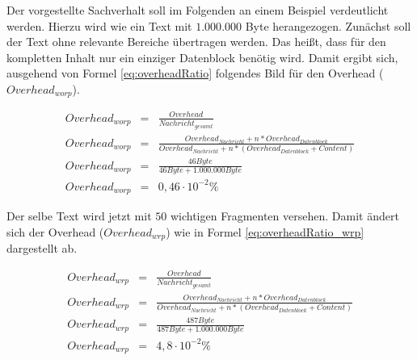 Der vorgestellte Sachverhalt soll im Folgenden an einem Beispiel
verdeutlicht werden. Hierzu wird wie ein Text mit $1.000.000$ Byte herangezogen.
Zunächst soll der Text ohne relevante Bereiche übertragen werden. Das heißt,
dass für den kompletten Inhalt nur ein einziger Datenblock benötig wird. Damit
ergibt sich, ausgehend von Formel \ref{eq:overheadRatio} folgendes Bild für den
Overhead ($Overhead_{worp}$).


\begin{eqnarray} 
	Overhead_{worp} & = & \frac{Overhead}{Nachricht_{gesamt}}\\
	Overhead_{worp} & = & \frac{Overhead_{Nachricht} + n * Overhead_{Datenblock}}{Overhead_{Nachricht} + n * (Overhead_{Datenblock} + Content)}\\
	Overhead_{worp} & = & \frac{46 Byte}{46 Byte + 1.000.000 Byte} \\
	Overhead_{worp} & = & 0,46 \cdot 10^{-2} \%
	\label{eq:overheadRatio_worp}
\end{eqnarray}

Der selbe Text wird jetzt mit $50$ wichtigen Fragmenten versehen. Damit ändert
sich der Overhead ($Overhead_{wrp}$) wie in Formel \ref{eq:overheadRatio_wrp}
dargestellt ab.


\begin{eqnarray} 
	Overhead_{wrp} & = & \frac{Overhead}{Nachricht_{gesamt}}\\
	Overhead_{wrp} & = & \frac{Overhead_{Nachricht} + n * Overhead_{Datenblock}}{Overhead_{Nachricht} + n * (Overhead_{Datenblock} + Content)}\\
	Overhead_{wrp} & = & \frac{487 Byte}{487 Byte + 1.000.000 Byte} \\
	Overhead_{wrp} & = & 4,8 \cdot 10^{-2} \%
	\label{eq:overheadRatio_wrp}
\end{eqnarray}

